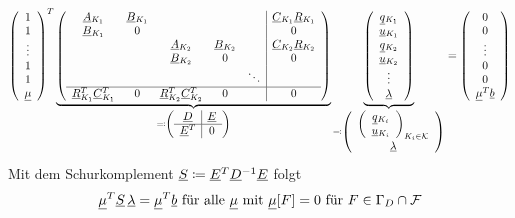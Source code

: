 \begin{gather*}
	\left(
		\begin{array}{c}
		1\\ 1 \\ \vdots \\ 1 \\ 1\\ \underline{\mu}{}
		\end{array}
	\right)^T
	\underbrace{\left(
	\begin{array}{ccccc|c}
	\underline{A}{}_{K_1} & \underline{B}{}_{K_1}&&&& \underline{C}{}_{K_1} \underline{R}{}_{K_1}\\
	\underline{B}{}_{K_1} & 0 &&&& 0\\
	&& \underline{A}{}_{K_2} & \underline{B}{}_{K_2} && \underline{C}{}_{K_2} \underline{R}{}_{K_2}\\
	 &  & \underline{B}{}_{K_2} & 0 && 0\\
	 &  &  &  &\ddots &\\
	\hline
	\underline{R}{}_{K_1}^T \underline{C}{}_{K_1}^T& 0 & \underline{R}{}_{K_2}^T \underline{C}{}_{K_2}^T& 0& &0 \\
	\end{array}
	\right)}_{\eqqcolon \left( \begin{array}{c|c}
	\underline{D}{} & \underline{E}{}\\
	\hline
	\underline{E}{}^T & 0
	\end{array} \right)}
	\underbrace{\left(
	\begin{array}{c}
		\underline{q}{}_{K_1}\\ \underline{u}{}_{K_1} \\ \underline{q}{}_{K_2}\\ \underline{u}{}_{K_2} \\ \vdots \\ \underline{\lambda}{}
	\end{array}
	\right)}_{\eqqcolon \left( \begin{array}{c}
		\left(
		\begin{array}{c}
			\underline{q}{}_{K_i}\\ \underline{u}{}_{K_i}
		\end{array}
		\right)_{K_i \in \mathcal{K}} \\ \underline{\lambda}{} 
	\end{array}\right)} = 
	\left(
	\begin{array}{c}
	0\\ 0 \\ \vdots \\ 0 \\ 0\\ \underline{\mu}{}^T \underline{b}{}
	\end{array}
	\right)
\end{gather*}
Mit dem Schurkomplement $ \underline{S}{} \coloneqq \underline{E}{}^T \underline{D}{}^{-1} \underline{E}{} $ folgt
\[ \underline{\mu}{}^T \underline{S}{} \, \underline{\lambda}{} = \underline{\mu}{}^T \underline{b}{} 	\text{ für alle } \underline{\mu}{} \text{ mit } \underline{\mu}{}[F] = 0 \text{ für } F \in \Gamma_D \cap \mathcal{F} \]

